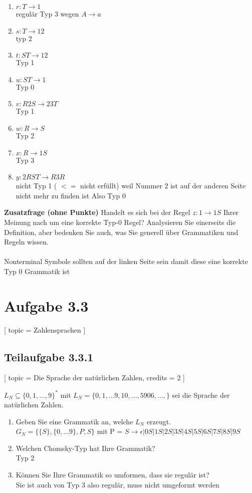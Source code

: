 \documentclass[12pt]{article}
\begin{document}
     
 \begin{enumerate} 
 \item $r: T \rightarrow 1$ \\ regulär Typ 3 wegen $A \rightarrow a$
 \item $s: T \rightarrow 12$ \\ typ 2 
 \item $t: ST \rightarrow 12$\\  Typ 1
 \item $u: ST \rightarrow 1$ \\ Typ 0 
 \item $v: R2S \rightarrow 23T$ \\  Typ 1
 \item $w: R \rightarrow S$\\ Typ 2
 \item $x: R \rightarrow 1S$ \\ Typ 3
 \item $y: 2RST \rightarrow R3R$ \\ nicht Typ 1 ( $< =$ nicht erfüllt) weil Nummer 2 ist auf der anderen Seite nicht mehr zu finden ist Also Typ 0
 \end{enumerate} 
  
 \textbf{Zusatzfrage (ohne Punkte)} Handelt es sich bei der Regel $z: 1 \rightarrow 1S$ Ihrer Meinung nach um eine korrekte Typ-0 Regel? Analysieren Sie einerseits die Definition, aber bedenken Sie auch, was Sie generell über Grammatiken und Regeln wissen.  
  \\\\
   Nonterminal Symbole sollten auf der linken Seite sein damit diese eine korrekte Typ 0 Grammatik ist 
  
  
  
 \section*{Aufgabe 3.3} [ 
 topic = Zahlensprachen 
 ] 
  
 \subsection*{Teilaufgabe 3.3.1} [ 
 topic = Die Sprache der natürlichen Zahlen, 
 credits = 2 
 ] 
  
 $L_N \subseteq \{0,1,\ldots,9\}^*$ mit $L_N = \{0, 1, \ldots 9, 10, \ldots, 5906, \ldots, \}$ sei die Sprache der natürlichen Zahlen. 
 \begin{enumerate} 
 \item Geben Sie eine Grammatik an, welche $L_N$ erzeugt.  
 \\
 $G_N = \{\{S\},\{0,...9\},P,S\}$ mit P =
 $S \rightarrow \epsilon|0S|1S|2S|3S|4S|5S|6S|7S|8S|9S$
 \item Welchen Chomsky-Typ hat Ihre Grammatik? \\
 Typ 2
 \item Können Sie Ihre Grammatik so umformen, dass sie regulär ist? \\
 Sie ist auch von Typ 3 also regulär, muss nicht umgeformt werden
 \end{enumerate}  
  
\end{document}
